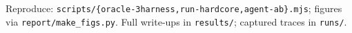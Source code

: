 \documentclass[11pt]{article}
\newcounter{fig}
\begin{document}
\vspace{6pt}{\color{rule}\hrule}\vspace{4pt}
{\footnotesize\color{plainc} Reproduce: \texttt{scripts/\{oracle-3harness,run-hardcore,agent-ab\}.mjs};
figures via \texttt{report/make\_figs.py}. Full write-ups in \texttt{results/}; captured traces in \texttt{runs/}.}
\end{document}
